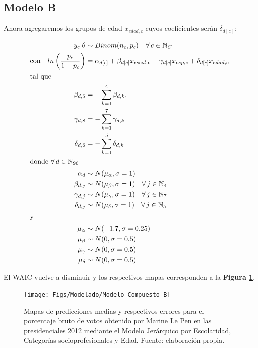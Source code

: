 \subsection*{Modelo B}

Ahora agregaremos los grupos de edad $x_{edad,c}$ cuyos coeficientes serán $\delta_{d[c]}$:

\begin{align}\label{eq:Modelo_Comp_B}
y_c|\theta & \sim Binom(n_c,p_c) \quad \forall \, c \in \mathbb{N}_C \nonumber \\
\text{con} \quad ln\left(\dfrac{p_c}{1-p_c}\right) &= \alpha_{d[c]} + \beta_{d[c]} x_{escol,c} + \gamma_{d[c]} x_{csp,c} + \delta_{d[c]} x_{edad,c} \\ 
\intertext{tal que} 
\beta_{d,5} &= -\sum\limits_{k = 1}^{4} \beta_{d,k}, \nonumber \\
\gamma_{d,8} &= -\sum\limits_{k = 1}^{7} \gamma_{d,k} \nonumber \\
\delta_{d,6} &= -\sum\limits_{k = 1}^{5} \delta_{d,k} \nonumber \\
\intertext{donde $\forall \, d \in \mathbb{N}_{96}$}
\alpha_d & \sim N(\mu_{\alpha}, \sigma=1) \quad  \nonumber \\
\beta_{d,j} & \sim N(\mu_{\beta}, \sigma=1) \quad \forall \, j \in \mathbb{N}_{4} \nonumber \\
\gamma_{d,j} & \sim N(\mu_{\gamma}, \sigma=1) \quad \forall \, j \in \mathbb{N}_{7} \nonumber \\
\delta_{d,j} & \sim N(\mu_{\delta}, \sigma=1) \quad \forall \, j \in \mathbb{N}_{5} \nonumber \\
\intertext{y}
\mu_{\alpha} &\sim N(-1.7,\sigma=0.25) \nonumber \\
\mu_{\beta} &\sim N(0,\sigma=0.5) \nonumber \\
\mu_{\gamma} &\sim N(0,\sigma=0.5) \nonumber \\
\mu_{\delta} &\sim N(0,\sigma=0.5) \nonumber
\end{align}

El WAIC vuelve a disminuir y los respectivos mapas corresponden a la \textbf{Figura \ref{fig:Modelo_Compuesto_B}}.\\ 

\begin{figure}[h]
	\centering
	\texttt{[image: Figs/Modelado/Modelo\_Compuesto\_B]}
	\caption{Mapas de predicciones medias y respectivos errores para el porcentaje bruto de votos obtenido por Marine Le Pen en las presidenciales 2012 mediante el Modelo Jerárquico por Escolaridad, Categorías socioprofesionales y Edad. Fuente: elaboración propia.}
	\label{fig:Modelo_Compuesto_B}
\end{figure}

